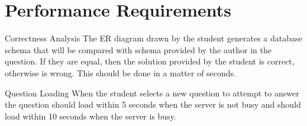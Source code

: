 \chapter{Performance Requirements}

    \begin{section}{Correctness Analysis}
    The ER diagram drawn by the student generates a database schema that will be compared with schema provided by the author in the question. If they are equal, then the solution provided by the student is correct, otherwise is wrong. This should be done in a matter of seconds.
    \end{section}
    
    \begin{section}{Question Loading}
    When the student selects a new question to attempt to answer the question should load within 5 seconds when the server is not busy and should load within 10 seconds when the server is busy.
    \end{section}
    


